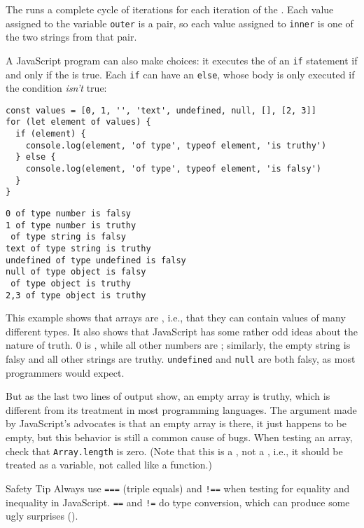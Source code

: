 The  runs a complete cycle of iterations
for each iteration of the .
Each value assigned to the variable \texttt{outer} is a pair,
so each value assigned to \texttt{inner} is one of the two strings from that pair.

A JavaScript program can also make choices:
it executes the  of an \texttt{if} statement
if and only if the  is true.
Each \texttt{if} can have an \texttt{else},
whose body is only executed if the condition \emph{isn't} true:

\begin{verbatim}
const values = [0, 1, '', 'text', undefined, null, [], [2, 3]]
for (let element of values) {
  if (element) {
    console.log(element, 'of type', typeof element, 'is truthy')
  } else {
    console.log(element, 'of type', typeof element, 'is falsy')
  }
}
\end{verbatim}

\begin{verbatim}
0 of type number is falsy
1 of type number is truthy
 of type string is falsy
text of type string is truthy
undefined of type undefined is falsy
null of type object is falsy
 of type object is truthy
2,3 of type object is truthy
\end{verbatim}

This example shows that arrays are ,
i.e.,
that they can contain values of many different types.
It also shows that JavaScript has some rather odd ideas about the nature of truth.
0 is , while all other numbers are ;
similarly,
the empty string is falsy and all other strings are truthy.
\texttt{undefined} and \texttt{null} are both falsy,
as most programmers would expect.

But as the last two lines of output show,
an empty array is truthy,
which is different from its treatment in most programming languages.
The argument made by JavaScript's advocates is that an empty array is there,
it just happens to be empty,
but this behavior is still a common cause of bugs.
When testing an array,
check that \texttt{Array.length} is zero.
(Note that this is a ,
not a ,
i.e.,
it should be treated as a variable,
not called like a function.)

\begin{aside}{Safety Tip}
  Always use \texttt{===} (triple equals) and \texttt{!==} when testing for equality and inequality in JavaScript.
  \texttt{==} and \texttt{!=} do type conversion,
  which can produce some ugly surprises ().
\end{aside}

